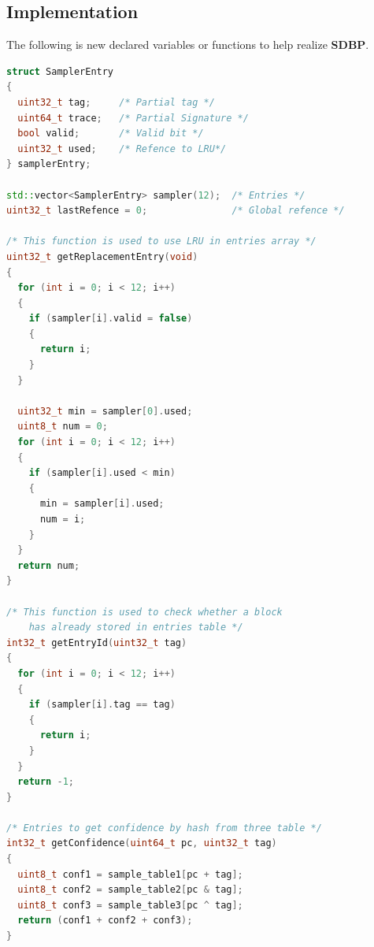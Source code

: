 \documentclass{article}
\begin{document}
\subsection{Implementation}
The following is new declared variables or functions to help realize \textbf{SDBP}.
\begin{lstlisting}[language=c++]
struct SamplerEntry
{
  uint32_t tag;     /* Partial tag */
  uint64_t trace;   /* Partial Signature */
  bool valid;       /* Valid bit */
  uint32_t used;    /* Refence to LRU*/
} samplerEntry;

std::vector<SamplerEntry> sampler(12);  /* Entries */
uint32_t lastRefence = 0;               /* Global refence */

/* This function is used to use LRU in entries array */
uint32_t getReplacementEntry(void)
{
  for (int i = 0; i < 12; i++)
  {
    if (sampler[i].valid = false)
    {
      return i;
    }
  }

  uint32_t min = sampler[0].used;
  uint8_t num = 0;
  for (int i = 0; i < 12; i++)
  {
    if (sampler[i].used < min)
    {
      min = sampler[i].used;
      num = i;
    }
  }
  return num;
}

/* This function is used to check whether a block 
    has already stored in entries table */
int32_t getEntryId(uint32_t tag)
{
  for (int i = 0; i < 12; i++)
  {
    if (sampler[i].tag == tag)
    {
      return i;
    }
  }
  return -1;
}

/* Entries to get confidence by hash from three table */
int32_t getConfidence(uint64_t pc, uint32_t tag)
{
  uint8_t conf1 = sample_table1[pc + tag];
  uint8_t conf2 = sample_table2[pc & tag];
  uint8_t conf3 = sample_table3[pc ^ tag];
  return (conf1 + conf2 + conf3);
}
\end{lstlisting}
\end{document}
